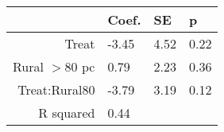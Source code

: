 \begin{tabular}{rlll}
  \hline
 & Coef. & SE & p \\ 
  \hline
Treat & -3.45 & 4.52 & 0.22 \\ 
  Rural $>$80 pc & 0.79 & 2.23 & 0.36 \\ 
  Treat:Rural80 & -3.79 & 3.19 & 0.12 \\ 
  R squared & 0.44 &  &  \\ 
   \hline
\end{tabular}

